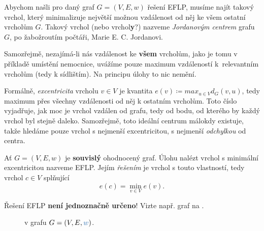 Abychom našli pro daný graf $G = (V,E,w)$ řešení EFLP, musíme najít takový
vrchol, který minimalizuje největší možnou vzdálenost od něj ke všem ostatní
vrcholům $G$. Takový vrchol (nebo vrchol\textbf{y}?) nazveme \emph{Jordanovým
centrem} grafu $G$, po žabožroutím počtáři, Marie E. C. Jordanovi.

Samozřejmě, nezajímá-li nás vzdálenost ke \textbf{všem} vrcholům, jako je tomu v
příkladě umístění nemocnice, uvážíme pouze maximum vzdáleností k~relevantním
vrcholům (tedy k sídlištím). Na principu úlohy to nic nemění.

Formálně, \emph{excentricita} vrcholu $v \in V$ je kvantita $e(v) \coloneqq
max_{u \in V} d_G(v,u)$, tedy maximum přes všechny vzdálenosti od něj k
ostatním vrcholům. Toto číslo vyjadřuje, jak moc je vrchol vzdálen od
 grafu, tedy od bodu, od kterého by každý vrchol byl
stejně daleko. Samozřejmě, toto ideální centrum málokdy existuje, takže hledáme
pouze vrchol s nej\-menší excentricitou, s nejmenší \emph{odchylkou} od centra.

\begin{definition}
\label{def:eflp}
 Ať $G = (V,E,w)$ je \textbf{souvislý} ohodnocený graf. Úlohu nalézt vrchol s
 minimální excentricitou nazveme EFLP. Jejím \emph{řešením} je vrchol s touto
 vlastností, tedy vrchol $c \in V$ splňující
 \[
  e(c) = \min_{v \in V} e(v).
 \]
\end{definition}

\begin{warning}
 Řešení EFLP \textbf{není jednoznačně určeno}! Vizte např. graf na
 .

 \begin{figure}[H]
 \centering
  \caption{ v grafu $G =
  (V,E,\clb{w})$.}
  \label{fig:minimalni-excentricita}
 \end{figure}
\end{warning}

